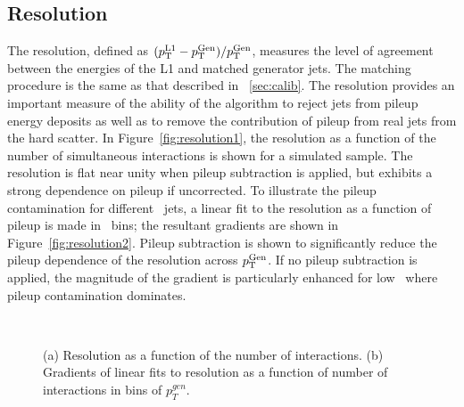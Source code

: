 \subsection{Resolution}

The resolution, defined as $({p_{\text T}^{\text{L1}}}-{p_{\text T}^{\text{Gen}}})/{p_{\text T}^{\text{Gen}}}$, measures the level of agreement between the energies of the 
L1 and matched generator jets. The matching procedure is the same as that described in \Section~\ref{sec:calib}.
The resolution provides an important measure of the ability of the algorithm to reject jets from pileup
energy deposits as well as to remove the contribution of pileup from real jets from the hard scatter.
In Figure~\ref{fig:resolution1}, the resolution as a function of the number of simultaneous interactions is shown for
a simulated \ttbar sample. The resolution is flat near unity when pileup subtraction is applied,
but exhibits a strong dependence on pileup if uncorrected. To illustrate the pileup contamination for different
\Genpt~jets, a linear fit to the resolution as a function of pileup is made in \Genpt~bins; the resultant gradients
are shown in Figure~\ref{fig:resolution2}. Pileup subtraction is shown to significantly reduce the 
pileup dependence of the resolution across ${p_{\text T}^{\text{Gen}}}$. If no pileup subtraction is applied, 
the magnitude of the gradient is particularly enhanced for low \Genpt~where pileup contamination dominates. 

\begin{figure}
    \begin{center} 
	~
	\caption{(a) Resolution as a function of the number of interactions. (b) Gradients of linear fits to 
	    resolution as a function of number of interactions in bins of $p^{gen}_{T}$.}
	    \label{fig:label:resolution}
    \end{center} 
\end{figure}


